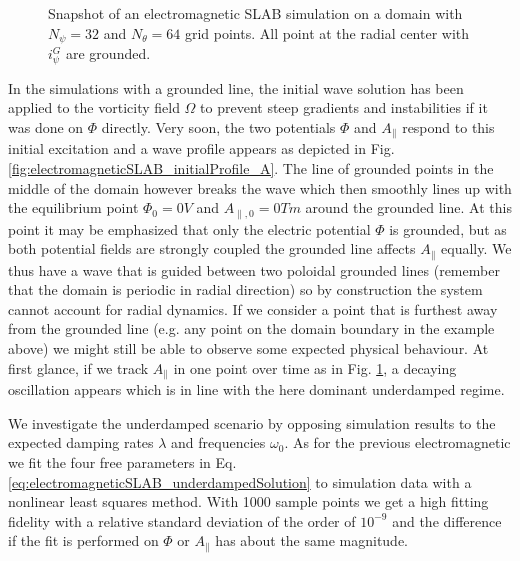 \begin{figure}[H]
\begin{subfigure}[b]{0.45\textwidth}
		\label{fig:electromagneticSLAB_evolution_A}
	\end{subfigure}
	\caption[Snapshot of an electromagnetic SLAB simulation on a domain with $N_\psi=32$ and $N_\theta=64$ grid points]{Snapshot of an electromagnetic SLAB simulation on a domain with $N_\psi=32$ and $N_\theta=64$ grid points. All point at the radial center with $i_\psi^G$ are grounded.}
	\label{fig:electromagneticGroundedSLAB_system}
\end{figure}

In the simulations with a grounded line, the initial wave solution has been applied to the vorticity field $\Omega$ to prevent steep gradients and instabilities if it was done on $\Phi$ directly. Very soon, the two potentials $\Phi$ and $A_\parallel$ respond to this initial excitation and a wave profile appears as depicted in Fig. \ref{fig:electromagneticSLAB_initialProfile_A}. The line of grounded points in the middle of the domain however breaks the wave which then smoothly lines up with the equilibrium point $\Phi_0 = 0V$ and $A_{\parallel,0} = 0Tm$ around the grounded line. At this point it may be emphasized that only the electric potential $\Phi$ is grounded, but as both potential fields are strongly coupled the grounded line affects $A_\parallel$ equally. We thus have a wave that is guided between two poloidal grounded lines (remember that the domain is periodic in radial direction) so by construction the system cannot account for radial dynamics. If we consider a point that is furthest away from the grounded line (e.g. any point on the domain boundary in the example above) we might still be able to observe some expected physical behaviour. At first glance, if we track $A_\parallel$ in one point over time as in Fig. \ref{fig:electromagneticSLAB_evolution_A}, a decaying oscillation appears which is in line with the here dominant underdamped regime. 	

We investigate the underdamped scenario by opposing simulation results to the expected damping rates $\lambda$ and frequencies $\omega_0$. As for the previous electromagnetic we fit the four free parameters in Eq. \ref{eq:electromagneticSLAB_underdampedSolution} to simulation data with a nonlinear least squares method. With 1000 sample points we get a high fitting fidelity with a relative standard deviation of the order of $10^{-9}$ and the difference if the fit is performed on $\Phi$ or $A_\parallel$ has about the same magnitude. 

